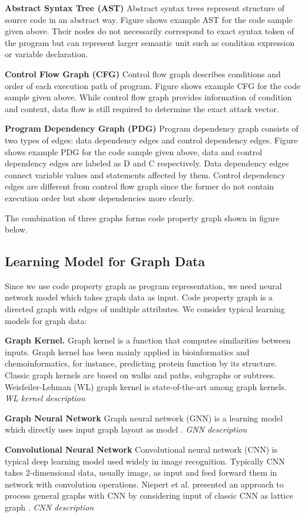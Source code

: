 \textbf{Abstract Syntax Tree (AST)} Abstract syntax trees represent structure of source code in an abstract way.
Figure shows example AST for the code sample given above.
Their nodes do not necessarily correspond to exact syntax token of the program but can represent larger semantic unit such as condition expression or variable declaration.

\textbf{Control Flow Graph (CFG)} Control flow graph describes conditions and order of each execution path of program.
Figure shows example CFG for the code sample given above.
While control flow graph provides information of condition and context, data flow is still required to determine the exact attack vector.

\textbf{Program Dependency Graph (PDG)} Program dependency graph consists of two types of edges: data dependency edges and control dependency edges.
Figure shows example PDG for the code sample given above, data and control dependency edges are labeled as D and C respectively.
Data dependency edges connect variable values and statements affected by them.
Control dependency edges are different from control flow graph since the former do not contain execution order but show dependencies more clearly.

The combination of three graphs forms code property graph shown in figure below.

\subsection{Learning Model for Graph Data}

Since we use code property graph as program representation, we need neural network model which takes graph data as input.
Code property graph is a directed graph with edges of multiple attributes.
We consider typical learning models for graph data:

\textbf{Graph Kernel.} Graph kernel is a function that computes similarities between inputs.
Graph kernel has been mainly applied in bioinformatics and chemoinformatics, for instance, predicting protein function by its structure.
Classic graph kernels are based on walks and paths, subgraphs or subtrees.
Weisfeiler-Lehman (WL) graph kernel \cite{shervashidze2011weisfeiler} is state-of-the-art among graph kernels.
\textit{WL kernel description}

\textbf{Graph Neural Network} Graph neural network (GNN) is a learning model which directly uses input graph layout as model \cite{gori2005new}.
\textit{GNN description}

\textbf{Convolutional Neural Network} Convolutional neural network (CNN) is typical deep learning model used widely in image recognition.
Typically CNN takes 2-dimensional data, usually image, as input and feed forward them in network with convolution operations.
Niepert et al. presented an approach to process general graphs with CNN by considering input of classic CNN as lattice graph \cite{niepert2016learning}.
\textit{CNN description}